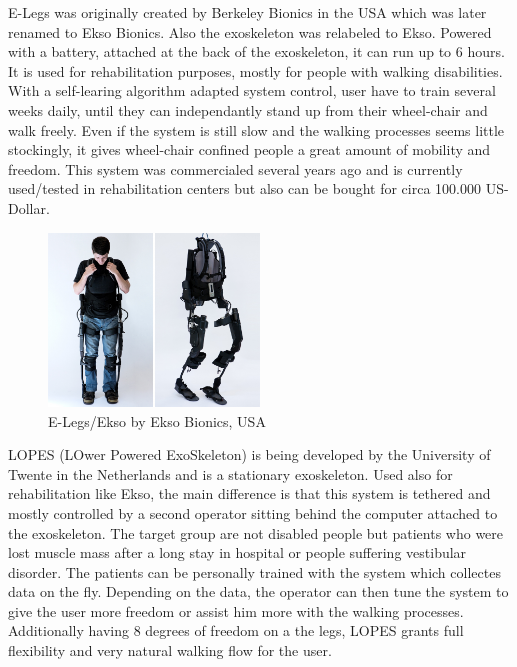 \documentclass[letterpaper, 10 pt, conference]{ieeeconf}  %
\begin{document}
E-Legs was originally created by Berkeley Bionics in the USA which was later renamed to Ekso Bionics. Also the exoskeleton was relabeled to Ekso. Powered with a battery, attached at the back of the exoskeleton, it can run up to 6 hours. It is used for rehabilitation purposes, mostly for people with walking disabilities. With a self-learing algorithm adapted system control, user have to train several weeks daily, until they can independantly stand up from their wheel-chair and walk freely. Even if the system is still slow and the walking processes seems little stockingly, it gives wheel-chair confined people a great amount of mobility and freedom. This system was commercialed several years ago and is currently used/tested in rehabilitation centers but also can be bought for circa 100.000 US-Dollar. \newline


\begin{figure}[H]
  \centering
    \includegraphics[width=0.5\textwidth]{img/elegs}
  \caption{E-Legs/Ekso by Ekso Bionics, USA}
\end{figure}


LOPES (LOwer Powered ExoSkeleton) is being developed by the University of Twente in the Netherlands and is a stationary exoskeleton. Used also for rehabilitation like Ekso, the main difference is that this system is tethered and mostly controlled by a second operator sitting behind the computer attached to the exoskeleton. The target group are not disabled people but patients who were lost muscle mass after a long stay in hospital or people suffering vestibular disorder. The patients can be personally trained with the system which collectes data on the fly. Depending on the data, the operator can then tune the system to give the user more freedom or assist him more with the walking processes. Additionally having 8 degrees of freedom on a the legs, LOPES grants full flexibility and very natural walking flow for the user.\newpage
\end{document}
